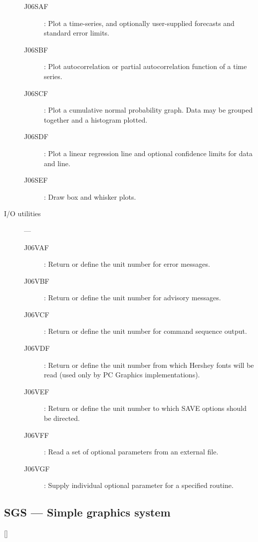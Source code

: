 \begin{description}
\begin{description}
\item [J06SAF] : Plot a time-series, and optionally user-supplied forecasts and standard error limits.
\item [J06SBF] : Plot autocorrelation or partial autocorrelation function of a time series.
\item [J06SCF] : Plot a cumulative normal probability graph. Data may be grouped together and a histogram plotted.
\item [J06SDF] : Plot a linear regression line and optional confidence limits for data and line.
\item [J06SEF] : Draw box and whisker plots.
\end{description}

\item [I/O utilities] ---

\begin{description}
\item [J06VAF] : Return or define the unit number for error messages.
\item [J06VBF] : Return or define the unit number for advisory messages.
\item [J06VCF] : Return or define the unit number for command sequence output.
\item [J06VDF] : Return or define the unit number from which Hershey fonts will be read (used only by PC Graphics implementations).
\item [J06VEF] : Return or define the unit number to which SAVE options should be directed.
\item [J06VFF] : Read a set of optional parameters from an external file.
\item [J06VGF] : Supply individual optional parameter for a specified routine.
\end{description}

\end{description}

\newpage

\subsection{SGS --- Simple graphics system}

\vspace{-9mm}

\hfill []

\vspace{2mm}

